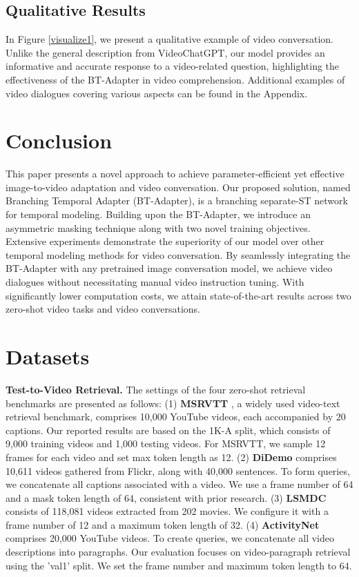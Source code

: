 \documentclass{article} \usepackage{iclr2024_conference,times}
\begin{document}
\subsection{Qualitative Results} 
In Figure \ref{visualize1}, we present a qualitative example of video conversation. Unlike the general description from VideoChatGPT, our model provides an informative and accurate response to a video-related question, highlighting the effectiveness of the BT-Adapter in video comprehension. Additional examples of video dialogues covering various aspects can be found in the Appendix.

\section{Conclusion}
This paper presents a novel approach to achieve parameter-efficient yet effective image-to-video adaptation and video conversation. Our proposed solution, named Branching Temporal Adapter (BT-Adapter), is a branching separate-ST network for temporal modeling. Building upon the BT-Adapter, we introduce an asymmetric masking technique along with two novel training objectives. Extensive experiments demonstrate the superiority of our model over other temporal modeling methods for video conversation. By seamlessly integrating the BT-Adapter with any pretrained image conversation model, we achieve video dialogues without necessitating manual video instruction tuning. With significantly lower computation costs, we attain state-of-the-art results across two zero-shot video tasks and video conversations.




\clearpage
\appendix
\section{Datasets} \label{appendix_dataset}
\textbf{Test-to-Video Retrieval.}
The settings of the four zero-shot retrieval benchmarks are presented as follows: (1) \textbf{MSRVTT} \citep{xu2016msr}, a widely used video-text retrieval benchmark, comprises 10,000 YouTube videos, each accompanied by 20 captions. Our reported results are based on the 1K-A split, which consists of 9,000 training videos and 1,000 testing videos. For MSRVTT, we sample 12 frames for each video and set max token length as 12. (2) \textbf{DiDemo} \citep{anne2017localizing} comprises 10,611 videos gathered from Flickr, along with 40,000 sentences. To form queries, we concatenate all captions associated with a video. We use a frame number of 64 and a mask token length of 64, consistent with prior research. (3) \textbf{LSMDC} \citep{rohrbach2017movie} consists of 118,081 videos extracted from 202 movies. We configure it with a frame number of 12 and a maximum token length of 32. (4) \textbf{ActivityNet} \citep{caba2015activitynet} comprises 20,000 YouTube videos. To create queries, we concatenate all video descriptions into paragraphs. Our evaluation focuses on video-paragraph retrieval using the 'val1' split. We set the frame number and maximum token length to 64.
\end{document}
